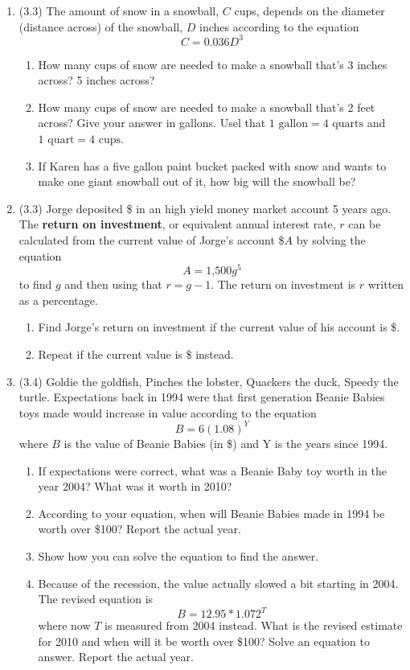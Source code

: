 \documentclass[12pt]{article}
\begin{document}
\begin{enumerate}
\item (3.3) The amount of snow in a snowball, $C$ cups, depends on the diameter (distance across) of the snowball, $D$ inches according to the equation $$C = 0.036D^3$$
\begin{enumerate}
\item How many cups of snow are needed to make a snowball that's 3 inches across? 5 inches across?
\item How many cups of snow are needed to make a snowball that's 2 feet across?
Give your answer in gallons.  Usel that $1 \text{ gallon} = 4 \text{ quarts}$ and $1 \text{ quart} = 4 \text{ cups}$.
\item  If Karen has a five gallon paint bucket packed with snow and wants to make one giant snowball out of it, how big will the snowball be? 
\end{enumerate}

\item (3.3)  Jorge deposited \$ in an high yield money market account 5 years ago.  The \textbf{return on investment}, or equivalent annual interest rate, $r$ can be calculated from the current value of Jorge's account \$$A$ by solving the equation
$$A = \text{1,500}g^5$$ to find $g$ and then using that $r= g-1$.  The return on investment is $r$ written as a percentage.
\begin{enumerate}
\item Find Jorge's return on investment if the current value of his account is \$.
\item Repeat if the current value is \$ instead.
\end{enumerate}

\item (3.4) Goldie the goldfish, Pinches the lobster, Quackers the duck, Speedy the turtle.  Expectations back in 1994 were that first generation Beanie Babies toys made would increase in value according to the equation $$B = 6(1.08)^Y$$ where $B$ is the value of Beanie Babies (in \$) and Y is the years since 1994.
\begin{enumerate}
\item If expectations were correct, what was a Beanie Baby toy worth in the year 2004?  What was it worth in 2010?
\item According to your equation, when will Beanie Babies made in 1994 be worth over \$100?  Report the actual year.
\item Show how you can solve the equation to find the answer.
\item Because of the recession, the value actually slowed a bit starting in 2004.  The revised equation is $$B = 12.95 \ast 1.072^T$$ where now $T$ is measured from 2004 instead.  What is the revised estimate for 2010 and when will it be worth over \$100?  Solve an equation to answer. Report the actual year.
\end{enumerate} 



\end{enumerate}
\end{document}
